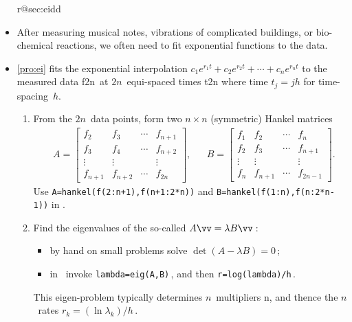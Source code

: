 \begin{itemize}
\ifcsname r@sec:eidd\endcsname%
\item After measuring musical notes, vibrations of complicated buildings, or bio-chemical reactions, we often need to fit exponential functions to the data.

\item \cref{pro:ei} fits the exponential interpolation \(c_1e^{r_1t}+c_2e^{r_2t}+\cdots+c_ne^{r_nt}\) to the measured data \hlist f{2n}\ at \(2n\)~equi-spaced times \hlist t{2n} where time \(t_j=jh\) for time-spacing~\(h\).
\begin{enumerate}
\item From the \(2n\)~data points, form two \(n\times n\) (symmetric) Hankel matrices 
\begin{align*}&
A=\begin{bmatrix} f_2&f_3&\cdots&f_{n+1}
\\f_3&f_4&\cdots&f_{n+2}
\\\vdots&\vdots&&\vdots
\\f_{n+1}&f_{n+2}&\cdots&f_{2n} \end{bmatrix},
&&
B=\begin{bmatrix} f_1&f_2&\cdots&f_{n}
\\f_2&f_3&\cdots&f_{n+1}
\\\vdots&\vdots&&\vdots
\\f_{n}&f_{n+1}&\cdots&f_{2n-1} \end{bmatrix}.
\end{align*}
Use \verb|A=hankel(f(2:n+1),f(n+1:2*n))| and \verb|B=hankel(f(1:n),f(n:2*n-1))| in \script.

\item Find the eigenvalues of the so-called  \(A\vv=\lambda B\vv\)\,: 
\begin{itemize}
\item by hand on small problems solve \(\det(A-\lambda B)=0\)\,;
\item in \script\ invoke \verb|lambda=eig(A,B)|\,, and then \verb|r=log(lambda)/h|\,.
\end{itemize}
This eigen-problem typically determines \(n\)~multipliers \hlist\lambda n, and thence the \(n\)~rates \(r_k=(\ln\lambda_k)/h\)\,.


\end{enumerate}
\end{itemize}
